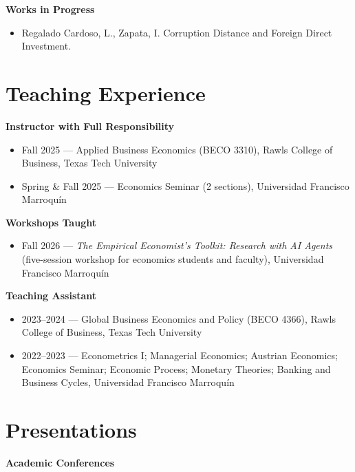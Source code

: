 \documentclass[11pt]{article}
\begin{document}
\textbf{Works in Progress}

\begin{itemize}
    \item Regalado Cardoso, L., Zapata, I. Corruption Distance and Foreign Direct Investment.
\end{itemize}

\section*{Teaching Experience}

\textbf{Instructor with Full Responsibility}

\begin{itemize}
    \item Fall 2025 --- Applied Business Economics (BECO 3310), Rawls College of Business, Texas Tech University
    \item Spring \& Fall 2025 --- Economics Seminar (2 sections), Universidad Francisco Marroquín
\end{itemize}

\textbf{Workshops Taught}

\begin{itemize}
    \item Fall 2026 --- \textit{The Empirical Economist's Toolkit: Research with AI Agents} (five-session workshop for economics students and faculty), Universidad Francisco Marroquín
\end{itemize}

\textbf{Teaching Assistant}

\begin{itemize}
    \item 2023--2024 --- Global Business Economics and Policy (BECO 4366), Rawls College of Business, Texas Tech University
    \item 2022--2023 --- Econometrics I; Managerial Economics; Austrian Economics; Economics Seminar; Economic Process; Monetary Theories; Banking and Business Cycles, Universidad Francisco Marroquín
\end{itemize}

\section*{Presentations}

\textbf{Academic Conferences}
\end{document}
